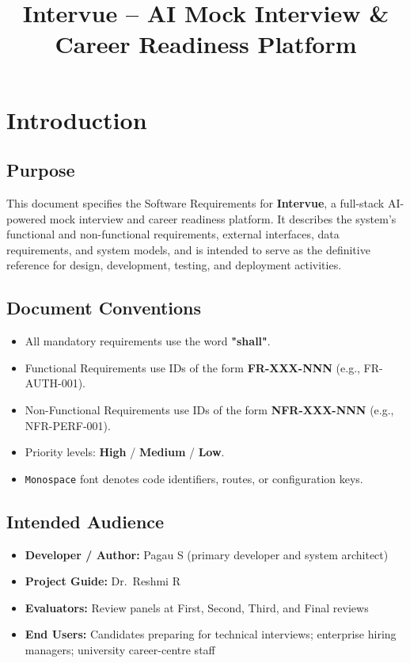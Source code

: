 \documentclass{fisatinternship}
\title{Intervue -- AI Mock Interview \& Career Readiness Platform}
\begin{document}
\maketitle
\newpage
{}
\tableofcontents
\newpage
{}


\newpage

\chapter{Introduction}

\section{Purpose}
This document specifies the Software Requirements for \textbf{Intervue}, a full-stack
AI-powered mock interview and career readiness platform. It describes the system's
functional and non-functional requirements, external interfaces, data requirements, and
system models, and is intended to serve as the definitive reference for design,
development, testing, and deployment activities.

\section{Document Conventions}
\begin{itemize}
  \item All mandatory requirements use the word \textbf{"shall"}.
  \item Functional Requirements use IDs of the form \textbf{FR-XXX-NNN} (e.g., FR-AUTH-001).
  \item Non-Functional Requirements use IDs of the form \textbf{NFR-XXX-NNN} (e.g., NFR-PERF-001).
  \item Priority levels: \textbf{High} / \textbf{Medium} / \textbf{Low}.
  \item \texttt{Monospace} font denotes code identifiers, routes, or configuration keys.
\end{itemize}

\section{Intended Audience}
\begin{itemize}
  \item \textbf{Developer / Author:} Pagau S (primary developer and system architect)
  \item \textbf{Project Guide:} Dr.\ Reshmi R
  \item \textbf{Evaluators:} Review panels at First, Second, Third, and Final reviews
  \item \textbf{End Users:} Candidates preparing for technical interviews; enterprise
        hiring managers; university career-centre staff
\end{itemize}
\end{document}
